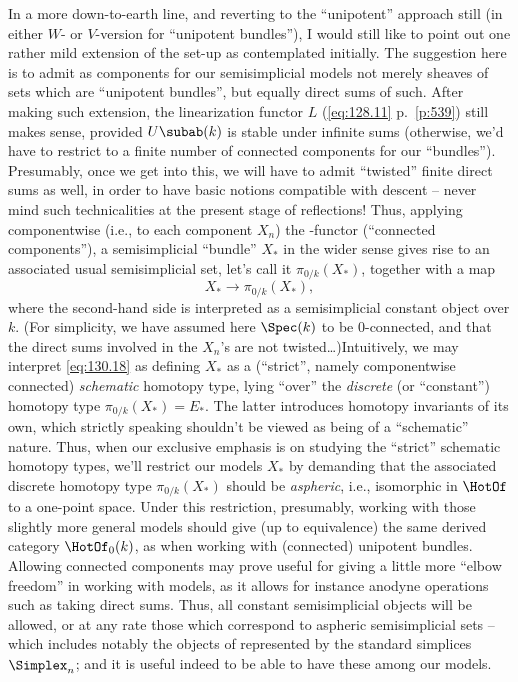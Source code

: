 \label{sec:130}%
In a more down-to-earth line, and reverting to the ``unipotent''
approach still (in either $W$- or $V$-version for ``unipotent
bundles''), I would still like to point out one rather mild extension
of the set-up as contemplated initially. The suggestion here is to
admit as components for our semisimplicial models not merely sheaves
of sets which are ``unipotent bundles'', but equally direct sums of
such. After making such extension, the linearization functor $L$
(\eqref{eq:128.11} p.~\ref{p:539}) still makes sense, provided
$U\subab(k)$ is stable under infinite sums (otherwise, we'd have to
restrict to a finite number of connected components for our
``bundles''). Presumably, once we get into this, we will have to admit
``twisted'' finite direct sums as well, in order to have basic notions
compatible with descent -- never mind such technicalities at the
present stage of reflections! Thus, applying componentwise (i.e., to
each component $X_n$) the \piz-functor (``connected components''), a
semisimplicial ``bundle'' $X_*$ in the wider sense gives rise to an
associated usual semisimplicial set, let's call it $\pi_{0/k}(X_*)$,
together with a map
\begin{equation}
  \label{eq:130.18}
  X_*\to \pi_{0/k}(X_*),\tag{18}
\end{equation}
where the second-hand side is interpreted as a semisimplicial constant
object over $k$. (For simplicity, we have assumed here $\Spec(k)$ to
be $0$-connected, and that the direct sums involved in the $X_n$'s are
not twisted\dots)\enspace Intuitively, we may interpret
\eqref{eq:130.18} as defining $X_*$ as a (``strict'', namely
componentwise connected) \emph{schematic} homotopy type, lying
``over'' the \emph{discrete} (or ``constant'') homotopy type
$\pi_{0/k}(X_*)=E_*$. The latter introduces homotopy invariants of its
own, which strictly speaking shouldn't be viewed as being of a
``schematic'' nature. Thus, when our exclusive emphasis is on studying
the ``strict'' schematic homotopy types, we'll restrict our models
$X_*$ by demanding that the associated discrete homotopy type
$\pi_{0/k}(X_*)$ should be \emph{aspheric}, i.e., isomorphic in
$\HotOf$ to a one-point space. Under this restriction, presumably,
working with those slightly more general models should give (up to
equivalence) the same derived category $\HotOf_0(k)$, as when working
with (connected) unipotent bundles. Allowing connected components may
prove useful for giving a little more ``elbow freedom'' in working
with models, as it allows for instance anodyne operations such as
taking direct sums. Thus, all constant semisimplicial objects will be
allowed, or at any rate those which correspond to aspheric
semisimplicial sets -- which includes notably the objects of
\Simplexhat{} represented by the standard simplices
$\Simplex_n$; and it is useful indeed to be able to have these among
our models.

